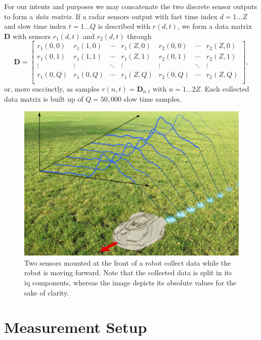 For our intents and purposes we may concatenate the two discrete sensor outputs to form a \emph{data matrix}. If a radar sensors output with fast time index $d=1...Z$ and slow time index $t=1...Q$ is described with $r(d,t)$, we form a data matrix $\mathbf{D}$ with sensors $r_1(d,t)$ and $r_2(d,t)$ through
\begin{equation}
	\mathbf{D}= 
	\begin{bmatrix}
		r_1(0,0) & r_1(1,0) & \cdots & r_1(Z,0) & r_2(0,0) & \cdots & r_2(Z,0) \\
		r_1(0,1) & r_1(1,1) & \cdots & r_1(Z,1) & r_2(0,1) & \cdots & r_2(Z,1) \\
		\vdots &  \vdots & \ddots & \vdots & \vdots & \ddots &  \vdots \\
		r_1(0,Q) & r_1(0,Q) & \cdots  & r_1(Z,Q) & r_2(0,Q) & \cdots  & r_2(Z,Q) \\
	\end{bmatrix}
	,
\end{equation}
or, more succinctly, as samples $r(n,t) = \mathbf{D}_{n,t}$ with $n=1...2Z$. Each collected data matrix is built up of $Q=50,000$ slow time samples.

\begin{figure}
	\centering
	\includegraphics[scale=0.60]{figs_temp/data_collecting.jpg}
	\caption{Two sensors mounted at the front of a robot collect data while the robot is moving forward. Note that the collected data is split in its \gls{iq} components, whereas the image depicts its absolute values for the sake of clarity.}
	\label{fig:data_collecting}
\end{figure}

\section{Measurement Setup}\label{sec:setup}


